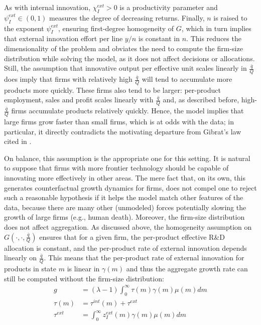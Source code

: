 \documentclass[12pt,english]{article}
\theoremstyle{remark}
\begin{document}
As with internal innovation, $\chi_I^{ext} > 0$ is a productivity parameter and $\psi_I^{ext} \in (0,1)$ measures the degree of decreasing returns. Finally, $n$ is raised to the exponent $\psi_I^{ext}$, ensuring first-degree homogeneity of $G$, which in turn implies that external innovation effort per line $y/n$ is constant in $n$. This reduces the dimensionality of the problem and obviates the need to compute the firm-size distribution while solving the model, as it does not affect decisions or allocations. Still, the assumption that innovative output per effective unit scales linearly in $\frac{\bar{q}}{Q}$ does imply that firms with relatively high $\frac{\bar{q}}{Q}$ will tend to accumulate more products more quickly. These firms also tend to be larger: per-product employment, sales and profit scales linearly with $\frac{\bar{q}}{Q}$ and, as described before, high-$\frac{\bar{q}}{Q}$ firms accumulate products relatively quickly. Hence, the model implies that large firms grow faster than small firms, which is at odds with the data; in particular, it directly contradicts the motivating departure from Gibrat's law cited in \cite{akcigit_growth_2018}. 

On balance, this assumption is the appropriate one for this setting. It is natural to suppose that firms with more frontier technology should be capable of innovating more effectively in other areas. The mere fact that, on its own, this generates counterfactual growth dynamics for firms, does not compel one to reject such a reasonable hypothesis if it helps the model match other features of the data, because there are many other (unmodeled) forces potentially slowing the growth of large firms (e.g., human death).  Moreover, the firm-size distribution does not affect aggregation. As discussed above, the homogeneity assumption on $G(\cdot,\cdot,\frac{\bar{q}}{Q})$ ensures that for a given firm, the per-product effective R\&D allocation is constant, and the per-product rate of external innovation depends linearly on $\frac{\bar{q}}{Q}$. This means that the per-product rate of external innovation for products in state $m$ is linear in $\gamma(m)$ and thus the aggregate growth rate can still be computed without the firm-size distribution: 
\begin{align*}
g &= (\lambda -1) \int_0^{\infty} \tau(m) \gamma(m) \mu(m) dm \\
\tau(m) &= \tau^{int} (m) + \tau^{ext} \\
\tau^{ext} &= \int_0^{\infty} z_I^{ext} (m) \gamma(m) \mu(m) dm
\end{align*}
\end{document}
